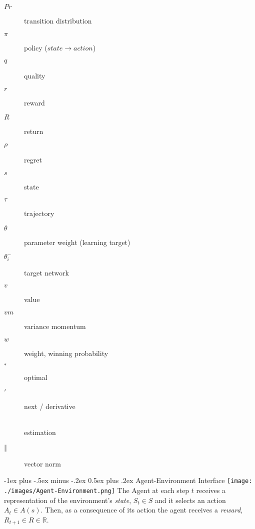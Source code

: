 \documentclass[10pt,landscape]{article}
\makeatletter
\renewcommand{\section}{\@startsection{section}{1}{0mm}%
                                {-1ex plus -.5ex minus -.2ex}%
                                {0.5ex plus .2ex}%
                                {\normalfont\large\bfseries}}
\makeatother
\begin{document}
\begin{multicols}{3}
\begin{description}
    \item[$Pr$]
    transition distribution
    \item[$\pi$]
    policy ($state \rightarrow action$)
    \item[$q$]
    quality
    \item[$r$]
    reward
    \item[$R$]
    return
    \item[$\rho$]
    regret
    \item[$s$]
    state
    \item[$\tau$]
    trajectory
    \item[$\theta$]
    parameter weight (learning target) %
    \item[$\theta_{i}^{-}$]
    target network
    \item[$v$]
    value
    \item[$vm$]
    variance momentum
    \item[$w$]
    weight, winning probability
    \item[$_{*}$]
    optimal
    \item[$'$]
    next / derivative
    \item[$\hat{}$]
    estimation
    \item[$‖$]
    vector norm
\end{description}

\section{Agent-Environment Interface}
\texttt{[image: ./images/Agent-Environment.png]}
The Agent at each step $t$ receives a representation of the environment's \emph{state},
$S_t \in S$ and it selects an action $A_t \in A(s)$.
Then, as a consequence of its action the agent receives a \emph{reward}, $R_{t + 1} \in R \in \mathbb{R}$.


\end{multicols}
\end{document}
